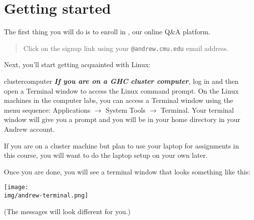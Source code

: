 \section*{Getting started}

The first thing you will do is to enroll in \qatoolName{}, our online Q\&A
platform.

\begin{quote}
  Click on the \qatoolName{} signup link
  \href{\qatoolSignupLink}{\tt\qatoolSignupLink} using your
  \lstinline'@andrew.cmu.edu' email address.

\end{quote}
\chkptA

\bigskip
{}
Next, you'll start getting acquainted with Linux:

\ifoncampus
\begin{colorpar}{clustercomputer}
\textbf{\em If you are on a GHC cluster computer}, log in
and then open
a Terminal window to access the Linux command prompt.
On the Linux machines in the computer labs, you can access a Terminal
window using the menu sequence: Applications $\longrightarrow$ System
Tools $\longrightarrow$ Terminal.  Your terminal window will give you
a prompt and you will be in your home directory in your Andrew
account.
\end{colorpar}
\fi
{}
\ifoncampus
If you are on a cluster machine but plan to use your
laptop for assignments in this course, you will want to do
the laptop setup on your own later.
\fi

\enlargethispage{5ex}
Once you are done, you will see a terminal window that looks something
like this:
\begin{center}
  \texttt{[image: \\img/andrew-terminal.png]}
\end{center}
\vspace{-2ex}
(The messages will look different for you.)


